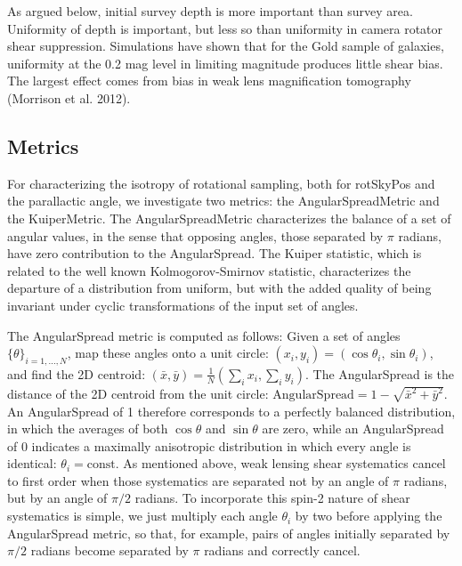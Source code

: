 As argued below, initial survey depth is more important than survey area.
Uniformity of depth is important, but less so than uniformity in camera rotator
shear suppression.  Simulations have shown that for the Gold sample of galaxies,
uniformity at the 0.2 mag level in limiting magnitude produces little shear
bias. The largest effect comes from bias in weak lens magnification tomography
(Morrison et al. 2012).


\subsection{Metrics}

For characterizing the isotropy of rotational sampling, both for rotSkyPos and
the parallactic angle, we investigate two metrics: the AngularSpreadMetric and
the KuiperMetric.  The AngularSpreadMetric characterizes the balance of a set of
angular values, in the sense that opposing angles, those separated by $\pi$
radians, have zero contribution to the AngularSpread.  The Kuiper statistic,
which is related to the well known Kolmogorov-Smirnov statistic, characterizes
the departure of a distribution from uniform, but with the added quality of
being invariant under cyclic transformations of the input set of angles.

The AngularSpread metric is computed as follows:  Given a set of angles
$\{\theta\}_{i=1, ..., N}$, map these angles onto a unit circle: $(x_i, y_i) =
(\cos \theta_i, \sin \theta_i)$, and find the 2D centroid: $(\bar{x}, \bar{y}) =
\frac{1}{N} (\sum_i x_i, \sum_i y_i)$.  The AngularSpread is the distance of the
2D centroid from the unit circle: $\mathrm{AngularSpread} = 1 - \sqrt{\bar{x}^2 +
\bar{y}^2}$.  An AngularSpread of 1 therefore corresponds to a perfectly
balanced distribution, in which the averages of both $\cos \theta$ and $\sin
\theta$ are zero, while an AngularSpread of 0 indicates a maximally anisotropic
distribution in which every angle is identical: $\theta_i = \mathrm{const}$.  As
mentioned above, weak lensing shear systematics cancel to first order when those
systematics are separated not by an angle of $\pi$ radians, but by an angle of
$\pi/2$ radians.  To incorporate this spin-2 nature of shear systematics is
simple, we just multiply each angle $\theta_i$ by two before applying the
AngularSpread metric, so that, for example, pairs of angles initially separated
by $\pi/2$ radians become separated by $\pi$ radians and correctly cancel.

